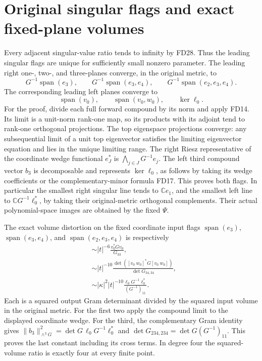 \documentclass[11pt]{article}
\newcommand{\C}{\mathbb C}
\providecommand{\Span}{\operatorname{span}}
\begin{document}
\section{Original singular flags and exact fixed-plane volumes}
Every adjacent singular-value ratio tends to infinity
by FD28. Thus the leading singular flags are unique for
sufficiently small nonzero parameter. The leading right
one-, two-, and three-planes converge, in the original
metric, to
\[
 G^{-1}\Span(e_3),\qquad
 G^{-1}\Span(e_3,e_4),\qquad
 G^{-1}\Span(e_2,e_3,e_4).
 \tag{FD29}
\]
The corresponding leading left planes converge to
\[
 \Span(v_0),\qquad \Span(v_0,w_0),\qquad \ker\ell_0.
 \tag{FD30}
\]
For the proof, divide each full forward compound by its
norm and apply FD14. Its limit is a unit-norm rank-one
map, so its products with its adjoint tend to rank-one
orthogonal projections. The top eigenspace projections
converge: any subsequential limit of a unit top eigenvector
satisfies the limiting eigenvector equation and lies in
the unique limiting range. The right Riesz representative
of the coordinate wedge functional \(e_J^*\) is
\(\bigwedge_{j\in J}G^{-1}e_j\). The left third compound
vector \(b_3\) is decomposable and represents \(\ker\ell_0\),
as follows by taking its wedge coefficients or the
complementary-minor formula FD17. This proves both flags.
In particular the smallest right singular line tends to
\(\C e_1\), and the smallest left line to
\(\C G^{-1}\ell_0^*\), by taking their original-metric
orthogonal complements. Their actual polynomial-space
images are obtained by the fixed \(\Psi\).

The exact volume distortion on the fixed coordinate
input flags \(\Span(e_3)\), \(\Span(e_3,e_4)\), and
\(\Span(e_2,e_3,e_4)\) is respectively
\[
\begin{aligned}
 &\sim |t|^{-6}\frac{v_0^*Gv_0}{G_{33}},\\
 &\sim |t|^{-10}
              \frac{\det([v_0\ w_0]^*G[v_0\ w_0])}{\det G_{34,34}},\\
 &\sim |\kappa|^2|t|^{-10}
              \frac{\ell_0G^{-1}\ell_0^*}{(G^{-1})_{11}}.
\end{aligned}\tag{FD31}
\]
Each is a squared output Gram determinant divided by
the squared input volume in the original metric. For
the first two apply the compound limit to the displayed
coordinate wedge. For the third, the complementary
Gram identity gives
\(\|b_3\|_{\wedge^3G}^2
=\det G\,\ell_0G^{-1}\ell_0^*\) and
\(\det G_{234,234}=\det G(G^{-1})_{11}\).
This proves the last constant including its cross terms.
In degree four the squared-volume ratio is exactly four
at every finite point.
\end{document}
